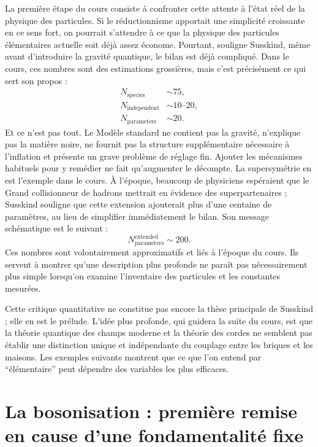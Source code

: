 La première étape du cours consiste à confronter cette attente à l’état réel de la physique des particules. Si le réductionnisme apportait une simplicité croissante en ce sens fort, on pourrait s’attendre à ce que la physique des particules élémentaires actuelle soit déjà assez économe. Pourtant, souligne Susskind, même avant d’introduire la gravité quantique, le bilan est déjà compliqué. Dans le cours, ces nombres sont des estimations grossières, mais c’est précisément ce qui sert son propos :
\begin{equation}
\begin{aligned}
N_{\mathrm{species}}&\sim 75,\\
N_{\mathrm{independent}}&\sim 10\text{--}20,\\
N_{\mathrm{parameters}}&\sim 20.
\end{aligned}
\end{equation}
Et ce n’est pas tout. Le Modèle standard ne contient pas la gravité, n’explique pas la matière noire, ne fournit pas la structure supplémentaire nécessaire à l’inflation et présente un grave problème de réglage fin. Ajouter les mécanismes habituels pour y remédier ne fait qu’augmenter le décompte. La supersymétrie en est l’exemple dans le cours. À l’époque, beaucoup de physiciens espéraient que le Grand collisionneur de hadrons mettrait en évidence des superpartenaires ; Susskind souligne que cette extension ajouterait plus d’une centaine de paramètres, au lieu de simplifier immédiatement le bilan. Son message schématique est le suivant :
\begin{equation}
N_{\mathrm{parameters}}^{\mathrm{extended}} \sim 200.
\end{equation}
Ces nombres sont volontairement approximatifs et liés à l’époque du cours. Ils servent à montrer qu’une description plus profonde ne paraît pas nécessairement plus simple lorsqu’on examine l’inventaire des particules et les constantes mesurées.

Cette critique quantitative ne constitue pas encore la thèse principale de Susskind ; elle en est le prélude. L’idée plus profonde, qui guidera la suite du cours, est que la théorie quantique des champs moderne et la théorie des cordes ne semblent pas établir une distinction unique et indépendante du couplage entre les briques et les maisons. Les exemples suivants montrent que ce que l’on entend par ``élémentaire'' peut dépendre des variables les plus efficaces.

\section{La bosonisation : première remise en cause d’une fondamentalité fixe}

